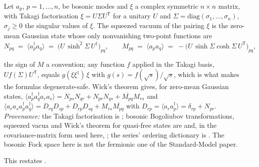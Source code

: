 Let $a_{p}$, $p = 1, \dots, n$, be bosonic modes and $\xi$ a complex symmetric $n \times n$ matrix, with Takagi factorisation $\xi = U\Sigma U^{\mathsf{T}}$ for a unitary $U$ and $\Sigma = \mathrm{diag}(\sigma_{1}, \dots, \sigma_{n})$, $\sigma_{j} \ge 0$ the singular values of $\xi$. The squeezed vacuum of the pairing $\xi$ is the zero-mean Gaussian state whose only nonvanishing two-point functions are
\[
N_{pq} \;=\; \langle a_{p}^{\dagger}a_{q}\rangle \;=\; \overline{\bigl(U\,\sinh^{2}\!\Sigma\,U^{\dagger}\bigr)}_{pq}, \qquad
M_{pq} \;=\; \langle a_{p}a_{q}\rangle \;=\; -\bigl(U\,\sinh\Sigma\cosh\Sigma\,U^{\mathsf{T}}\bigr)_{pq},
\]

the sign of $M$ a convention; any function $f$ applied in the Takagi basis, $U f(\Sigma) U^{\mathsf{T}}$, equals $g(\xi\xi^{\dagger})\,\xi$ with $g(s) = f(\sqrt{s})/\sqrt{s}$, which is what makes the formulas degenerate-safe. Wick's theorem gives, for zero-mean Gaussian states, $\langle a_{p}^{\dagger}a_{q}^{\dagger}a_{r}a_{s}\rangle = N_{ps}N_{qr} + N_{pr}N_{qs} + \overline{M_{pq}}M_{rs}$ and $\langle a_{r}a_{s}a_{p}^{\dagger}a_{q}^{\dagger}\rangle = D_{rq}D_{sp} + D_{rp}D_{sq} + M_{rs}\overline{M_{pq}}$ with $D_{rp} = \langle a_{r}a_{p}^{\dagger}\rangle = \delta_{rp} + N_{pr}$. \emph{Provenance:} the Takagi factorisation is \cite[Cor.~4.4.4]{HornJohnson}; bosonic Bogoliubov transformations, squeezed vacua and Wick's theorem for quasi-free states are \cite[Ch.~2-3]{Berezin1966} and, in the covariance-matrix form used here, \cite[\S II]{Weedbrook2012}; the series' ordering dictionary is \cite[Thm.~5.7]{ButlerT9}. The bosonic Fock space here is not the fermionic one of the Standard-Model paper.

This restates .
